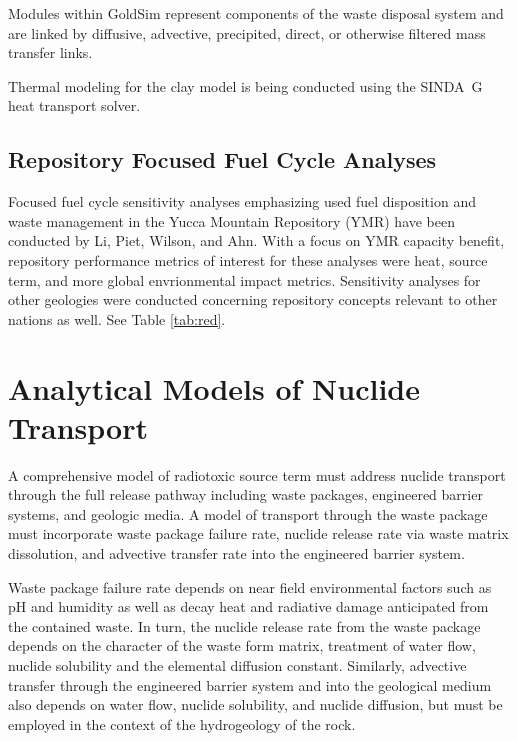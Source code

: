 Modules within GoldSim represent components of the waste disposal 
system and are linked by diffusive, advective, precipited, direct, or  
otherwise filtered mass transfer links.

Thermal modeling for the clay model is being conducted using the 
SINDA\ G heat transport solver.  

\subsection{Repository Focused Fuel Cycle Analyses}

Focused fuel cycle sensitivity analyses emphasizing used fuel 
disposition and waste management in the Yucca Mountain Repository 
(YMR) have been conducted by Li, Piet, Wilson, and Ahn. With a focus 
on YMR capacity benefit, repository performance metrics of interest 
for these analyses were heat, source term, and more global 
envrionmental impact metrics.  Sensitivity analyses for other 
geologies were conducted concerning repository concepts relevant to 
other nations as well. See Table \ref{tab:red}.

\section{Analytical Models of Nuclide Transport} 
\label{sec:analytical_nuc}


A comprehensive model of radiotoxic source term must address nuclide 
transport through the full release pathway including waste packages, 
engineered barrier systems, and geologic media. A model of transport 
through the waste package must incorporate waste package failure rate, 
nuclide release rate via waste matrix dissolution, and advective 
transfer rate into the engineered barrier system.  

Waste package failure rate depends on near field environmental factors 
such as pH and humidity as well as decay heat and radiative damage 
anticipated from the contained waste.  In turn, the nuclide release 
rate from the waste package depends on the character of the waste form 
matrix, treatment of water flow, nuclide solubility and the elemental 
diffusion constant.  Similarly, advective transfer through the 
engineered barrier system and into the geological medium also depends 
on water flow, nuclide solubility, and nuclide diffusion, but must be 
employed in the context of the hydrogeology of the rock.   

